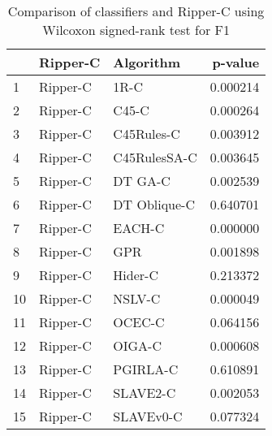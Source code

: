 \begin{table}
\footnotesize
\caption{Comparison of classifiers and Ripper-C using Wilcoxon signed-rank test for F1}
\label{tab:Ripper-C wilcoxon F1 comparison}
\begin{tabular}{lllr}
\hline
 & Ripper-C & Algorithm & p-value \\
\hline
1 & Ripper-C & 1R-C & 0.000214 \\
2 & Ripper-C & C45-C & 0.000264 \\
3 & Ripper-C & C45Rules-C & 0.003912 \\
4 & Ripper-C & C45RulesSA-C & 0.003645 \\
5 & Ripper-C & DT GA-C & 0.002539 \\
6 & Ripper-C & DT Oblique-C & 0.640701 \\
7 & Ripper-C & EACH-C & 0.000000 \\
8 & Ripper-C & GPR & 0.001898 \\
9 & Ripper-C & Hider-C & 0.213372 \\
10 & Ripper-C & NSLV-C & 0.000049 \\
11 & Ripper-C & OCEC-C & 0.064156 \\
12 & Ripper-C & OIGA-C & 0.000608 \\
13 & Ripper-C & PGIRLA-C & 0.610891 \\
14 & Ripper-C & SLAVE2-C & 0.002053 \\
15 & Ripper-C & SLAVEv0-C & 0.077324 \\
\hline
\end{tabular}
\end{table}
